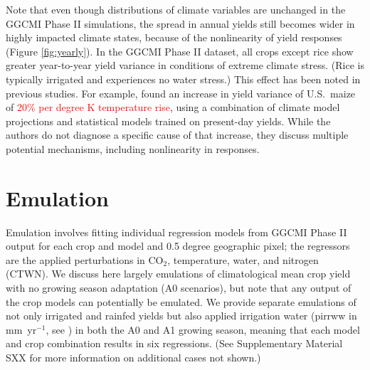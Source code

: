 \documentclass[gmd, manuscript]{copernicus} %
\begin{document}
Note that even though distributions of climate variables are unchanged in the GGCMI Phase II simulations, the spread in annual yields still becomes wider in highly impacted climate states, because of the nonlinearity of yield responses (Figure \ref{fig:yearly}). 
In the GGCMI Phase II dataset, all crops except rice show  greater year-to-year yield variance  in conditions of extreme climate stress. %
(Rice is typically irrigated and experiences no water stress.) 
This effect has been noted in previous studies. For example, \cite{Urban2012} found an increase in yield variance of U.S.\ maize of \textcolor{red}{20\% per degree K temperature rise}, using a combination of climate model projections and statistical models trained on present-day yields. While the authors do not diagnose a specific cause of that increase, they discuss multiple potential mechanisms, including nonlinearity in responses. 


\section{Emulation}
\label{S:3}
Emulation involves fitting individual regression models from GGCMI Phase II output for each crop and model and 0.5 degree geographic pixel; the regressors are the applied perturbations in CO$_2$, temperature, water, and nitrogen (CTWN). 
We discuss here largely emulations of climatological mean crop yield with no growing season adaptation (A0 scenarios), but note that any output of the crop models can potentially be emulated. 
We provide separate emulations of not only irrigated and rainfed yields but also applied irrigation water (pirrww in mm\ yr$^{-1}$, see \citep{Franke2019a}) in both the A0 and A1 growing season, meaning that each model and crop combination results in six regressions. (See Supplementary Material SXX for more information on additional cases not shown.)
\end{document}
